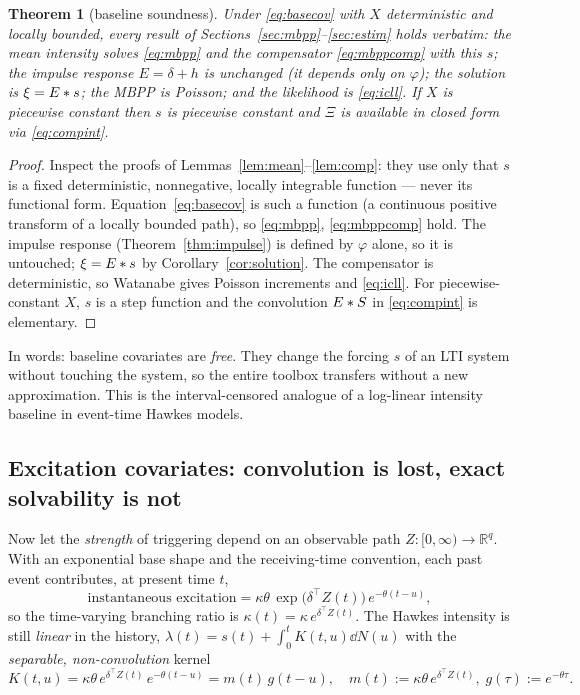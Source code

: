\documentclass[11pt]{article}
\theoremstyle{plain}
\newtheorem{theorem}{Theorem}[section]
\theoremstyle{definition}
\theoremstyle{remark}
\newcommand{\R}{\mathbb{R}}\newcommand{\N}{\mathbb{N}}\newcommand{\E}{\mathbb{E}}
\begin{document}
\begin{theorem}[baseline soundness]
\label{thm:baseline}
Under \eqref{eq:basecov} with $X$ deterministic and locally bounded, every result
of Sections~\ref{sec:mbpp}--\ref{sec:estim} holds verbatim: the mean intensity
solves \eqref{eq:mbpp} and the compensator \eqref{eq:mbppcomp} with this $s$; the
impulse response $E=\delta+h$ is \emph{unchanged} (it depends only on $\varphi$);
the solution is $\xi=E\ast s$; the MBPP is Poisson; and the likelihood is
\eqref{eq:icll}. If $X$ is piecewise constant then $s$ is piecewise constant and
$\Xi$ is available in closed form via \eqref{eq:compint}.
\end{theorem}
\begin{proof}
Inspect the proofs of Lemmas~\ref{lem:mean}--\ref{lem:comp}: they use only that
$s$ is a fixed deterministic, nonnegative, locally integrable function --- never
its functional form. Equation~\eqref{eq:basecov} is such a function (a continuous
positive transform of a locally bounded path), so \eqref{eq:mbpp},
\eqref{eq:mbppcomp} hold. The impulse response (Theorem~\ref{thm:impulse}) is
defined by $\varphi$ alone, so it is untouched; $\xi=E\ast s$ by
Corollary~\ref{cor:solution}. The compensator is deterministic, so Watanabe gives
Poisson increments and \eqref{eq:icll}. For piecewise-constant $X$, $s$ is a
step function and the convolution $E\ast S$ in \eqref{eq:compint} is elementary.
\end{proof}

In words: baseline covariates are \emph{free}. They change the forcing $s$ of an
LTI system without touching the system, so the entire toolbox transfers without a
new approximation. This is the interval-censored analogue of a log-linear
intensity baseline in event-time Hawkes models.

\subsection{Excitation covariates: convolution is lost, exact solvability is not}

Now let the \emph{strength} of triggering depend on an observable path
$Z:[0,\infty)\to\R^q$. With an exponential base shape and the receiving-time
convention, each past event contributes, at present time $t$,
\begin{equation}
\text{instantaneous excitation}=\kappa\theta\,\exp\!\big(\delta^\top Z(t)\big)\,e^{-\theta(t-u)},
\label{eq:exccov}
\end{equation}
so the time-varying branching ratio is $\kappa(t)=\kappa\,e^{\delta^\top Z(t)}$.
The Hawkes intensity is still \emph{linear} in the history,
$\lambda(t)=s(t)+\int_0^t K(t,u)\dd N(u)$ with the \emph{separable, non-convolution}
kernel
\begin{equation}
K(t,u)=\kappa\theta\,e^{\delta^\top Z(t)}\,e^{-\theta(t-u)}=m(t)\,g(t-u),\quad
m(t):=\kappa\theta\,e^{\delta^\top Z(t)},\; g(\tau):=e^{-\theta\tau}.
\label{eq:sepkernel}
\end{equation}
\end{document}
